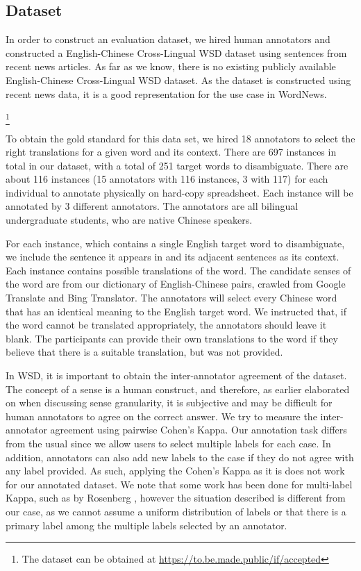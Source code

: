 \subsection{Dataset}
In order to construct an evaluation dataset, we hired human annotators and constructed a English-Chinese Cross-Lingual WSD dataset using sentences from recent news articles. As far as we know, there is no existing publicly available English-Chinese Cross-Lingual WSD dataset. As the dataset is constructed using recent news data, it is a good representation for the use case in WordNews. {\footnote{The dataset can be obtained at %
{\url{https://to.be.made.public/if/accepted}}}

To obtain the gold standard for this data set, we hired 18 annotators to select the right translations for a given word and its context. There are 697 instances in total in our dataset, with a total of 251 target words to disambiguate. There are about 116 instances (15 annotators with 116 instances, 3 with 117) for each individual to annotate physically on hard-copy spreadsheet. Each instance will be annotated by 3 different annotators. The annotators are all bilingual undergraduate students, who are native Chinese speakers. 

For each instance, which contains a single English target word to disambiguate, we include the sentence it appears in and its adjacent sentences as its context. Each instance contains possible translations of the word. The candidate senses of the word are from our dictionary of English-Chinese pairs, crawled from Google Translate and Bing Translator. The annotators will select every Chinese word that has an identical meaning to the English target word. We instructed that, if the word cannot be translated appropriately, the annotators should leave it blank. The participants can provide their own translations to the word if they believe that there is a suitable translation, but was not provided. 


In WSD, it is important to obtain the inter-annotator agreement of the dataset. The concept of a sense is a human construct, and therefore, as earlier elaborated on when discussing sense granularity, it is subjective and may be difficult for human annotators to agree on the correct answer. We try to measure the inter-annotator agreement using pairwise Cohen's Kappa. Our annotation task differs from the usual since we allow users to select multiple labels for each case. In addition, annotators can also add new labels to the case if they do not agree with any label provided. As such, applying the Cohen's Kappa as it is does not work for our annotated dataset. We note that some work has been done for multi-label Kappa, such as by Rosenberg , however the situation described  is different from our case, as we cannot assume a uniform distribution of labels or that there is a primary label among the multiple labels selected by an annotator. 

}
